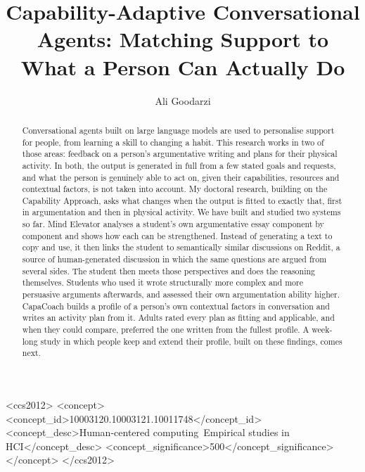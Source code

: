 \documentclass[manuscript,screen,review]{acmart}
\begin{document}
\title{Capability-Adaptive Conversational Agents: Matching Support to What a Person Can Actually Do}

\author{Ali Goodarzi}

\renewcommand{\shortauthors}{Goodarzi}

\begin{abstract}
Conversational agents built on large language models are used to personalise support for people, from learning a skill to changing a habit. This research works in two of those areas: feedback on a person's argumentative writing and plans for their physical activity. In both, the output is generated in full from a few stated goals and requests, and what the person is genuinely able to act on, given their capabilities, resources and contextual factors, is not taken into account. My doctoral research, building on the Capability Approach, asks what changes when the output is fitted to exactly that, first in argumentation and then in physical activity. We have built and studied two systems so far. Mind Elevator analyses a student's own argumentative essay component by component and shows how each can be strengthened. Instead of generating a text to copy and use, it then links the student to semantically similar discussions on Reddit, a source of human-generated discussion in which the same questions are argued from several sides. The student then meets those perspectives and does the reasoning themselves. Students who used it wrote structurally more complex and more persuasive arguments afterwards, and assessed their own argumentation ability higher. CapaCoach builds a profile of a person's own contextual factors in conversation and writes an activity plan from it. Adults rated every plan as fitting and applicable, and when they could compare, preferred the one written from the fullest profile. A week-long study in which people keep and extend their profile, built on these findings, comes next.
\end{abstract}

\begin{CCSXML}
<ccs2012>
<concept>
<concept_id>10003120.10003121.10011748</concept_id>
<concept_desc>Human-centered computing~Empirical studies in HCI</concept_desc>
<concept_significance>500</concept_significance>
</concept>
</ccs2012>
\end{CCSXML}

\end{document}

